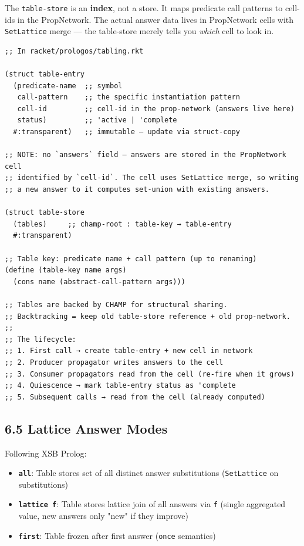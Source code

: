 \documentclass[11pt]{article}
\begin{document}
The \texttt{table-store} is an \textbf{index}, not a store. It maps predicate call patterns
to cell-ids in the PropNetwork. The actual answer data lives in PropNetwork
cells with \texttt{SetLattice} merge — the table-store merely tells you \emph{which}
cell to look in.

\begin{verbatim}
;; In racket/prologos/tabling.rkt

(struct table-entry
  (predicate-name  ;; symbol
   call-pattern    ;; the specific instantiation pattern
   cell-id         ;; cell-id in the prop-network (answers live here)
   status)         ;; 'active | 'complete
  #:transparent)   ;; immutable — update via struct-copy

;; NOTE: no `answers` field — answers are stored in the PropNetwork cell
;; identified by `cell-id`. The cell uses SetLattice merge, so writing
;; a new answer to it computes set-union with existing answers.

(struct table-store
  (tables)     ;; champ-root : table-key → table-entry
  #:transparent)

;; Table key: predicate name + call pattern (up to renaming)
(define (table-key name args)
  (cons name (abstract-call-pattern args)))

;; Tables are backed by CHAMP for structural sharing.
;; Backtracking = keep old table-store reference + old prop-network.
;;
;; The lifecycle:
;; 1. First call → create table-entry + new cell in network
;; 2. Producer propagator writes answers to the cell
;; 3. Consumer propagators read from the cell (re-fire when it grows)
;; 4. Quiescence → mark table-entry status as 'complete
;; 5. Subsequent calls → read from the cell (already computed)
\end{verbatim}
\subsection{6.5 Lattice Answer Modes}
\label{sec:org0f095a6}

Following XSB Prolog:

\begin{itemize}
\item \textbf{\texttt{all}}: Table stores set of all distinct answer substitutions
(\texttt{SetLattice} on substitutions)
\item \textbf{\texttt{lattice f}}: Table stores lattice join of all answers via \texttt{f}
(single aggregated value, new answers only "new" if they improve)
\item \textbf{\texttt{first}}: Table frozen after first answer (\texttt{once} semantics)
\end{itemize}
\end{document}
